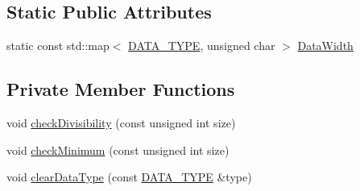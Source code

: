 \subsection*{Static Public Attributes}
\begin{DoxyCompactItemize}
\item 
static const std\+::map$<$ \hyperlink{class_graphics_1_1_vertex_data_a50e88236939dc2a3ec4df7aeb728620e}{D\+A\+T\+A\+\_\+\+T\+Y\+P\+E}, unsigned char $>$ \hyperlink{class_graphics_1_1_vertex_data_a8b7b2345af2cce65482bf48c503f15f6}{Data\+Width}
\end{DoxyCompactItemize}
\subsection*{Private Member Functions}
\begin{DoxyCompactItemize}
\item 
void \hyperlink{class_graphics_1_1_vertex_data_a90ba58b28b6981de0d841dfaff056bd9}{check\+Divisibility} (const unsigned int size)
\item 
void \hyperlink{class_graphics_1_1_vertex_data_a6bbb857b2a231cd75a236adfb553e976}{check\+Minimum} (const unsigned int size)
\item 
void \hyperlink{class_graphics_1_1_vertex_data_ac506af313dd521dfd05c566df3bf41bd}{clear\+Data\+Type} (const \hyperlink{class_graphics_1_1_vertex_data_a50e88236939dc2a3ec4df7aeb728620e}{D\+A\+T\+A\+\_\+\+T\+Y\+P\+E} \&type)
\end{DoxyCompactItemize}
